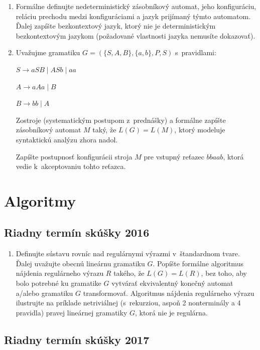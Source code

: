 \documentclass[11pt,a4paper]{article}
\begin{document}
		\begin{enumerate}
			\item Formálne definujte nedeterministický zásobníkový automat, jeho konfiguráciu, reláciu prechodu medzi konfiguráciami a jazyk prijímaný týmto automatom. Ďalej zapíšte bezkontextový jazyk, ktorý nie je deterministickým bezkontextovým jazykom (požadované vlastnosti jazyka nemusíte dokazovať).
			\item Uvažujme gramatiku $G = (\{S,A,B\}, \{a,b\}, P, S)$ s~pravidlami:
			
			$S \rightarrow aSB \mid ASb \mid aa$
			
			$A \rightarrow aAa \mid B$
			
			$B \rightarrow bb \mid A$
			
			Zostroje (systematickým postupom z~prednášky) a formálne zapíšte zásobníkový automat $M$ taký, že $L(G) = L(M)$, ktorý modeluje syntaktickú analýzu zhora nadol.
			
			Zapíšte postupnosť konfigurácii stroja $M$ pre vstupný reťazec $bbaab$, ktorá vedie k~akceptovaniu tohto reťazca.
		\end{enumerate}

	\section{Algoritmy}

		\subsection{Riadny termín skúšky 2016}

		\begin{enumerate}
			\item Definujte sústavu rovníc nad regulárnymi výrazmi v~štandardnom tvare. Ďalej uvažujte obecnú lineárnu gramatiku $G$. Popíšte formálne algoritmus nájdenia regulárneho výrazu $R$ takého, že $L(G) = L(R)$, bez toho, aby bolo potrebné ku gramatike $G$ vytvárať ekvivalentný konečný automat a/alebo gramatiku $G$ transformovať. Algoritmus nájdenia regulárneho výrazu ilustrujte na príklade netriviálnej (s~rekurziou, aspoň 2 nonterminály a 4 pravidla) pravej lineárnej gramatiky $G$, ktorá nie je regulárna.
		\end{enumerate}

		\subsection{Riadny termín skúšky 2017}
\end{document}
